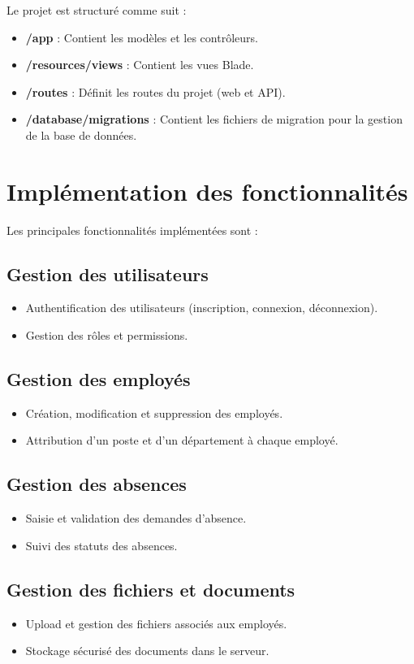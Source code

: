 Le projet est structuré comme suit :
\begin{itemize}
    \item \textbf{/app} : Contient les modèles et les contrôleurs.
    \item \textbf{/resources/views} : Contient les vues Blade.
    \item \textbf{/routes} : Définit les routes du projet (web et API).
    \item \textbf{/database/migrations} : Contient les fichiers de migration pour la gestion de la base de données.
\end{itemize}

\section{Implémentation des fonctionnalités}
Les principales fonctionnalités implémentées sont :
\subsection{Gestion des utilisateurs}
\begin{itemize}
    \item Authentification des utilisateurs (inscription, connexion, déconnexion).
    \item Gestion des rôles et permissions.
\end{itemize}

\subsection{Gestion des employés}
\begin{itemize}
    \item Création, modification et suppression des employés.
    \item Attribution d’un poste et d’un département à chaque employé.
\end{itemize}

\subsection{Gestion des absences}
\begin{itemize}
    \item Saisie et validation des demandes d'absence.
    \item Suivi des statuts des absences.
\end{itemize}

\subsection{Gestion des fichiers et documents}
\begin{itemize}
    \item Upload et gestion des fichiers associés aux employés.
    \item Stockage sécurisé des documents dans le serveur.
\end{itemize}

